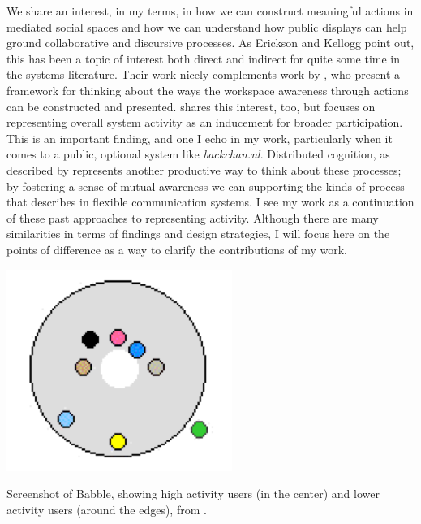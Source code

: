 \documentclass{tufte-handout}
\begin{document}
We share an interest, in my terms, in how we can construct meaningful actions in mediated social spaces and how we can understand how public displays can help ground collaborative and discursive processes. As Erickson and Kellogg point out, this has been a topic of interest both direct and indirect for quite some time in the systems literature. Their work nicely complements work by \citet{Gutwin:2002tf}, who present a framework for thinking about the ways the workspace awareness through actions can be constructed and presented.  \citet{Ackerman:1995tj} shares this interest, too, but focuses on representing overall system activity as an inducement for broader participation. This is an important finding, and one I echo in my work, particularly when it comes to a public, optional system like \emph{backchan.nl}. Distributed cognition, as described by \citet{Hollan:2000ud} represents another productive way to think about these processes; by fostering a sense of mutual awareness we can supporting the kinds of process that \citet{Hutchins:1995ud} describes in flexible communication systems. I see my work as a continuation of these past approaches to representing activity. Although there are many similarities in terms of findings and design strategies, I will focus here on the points of difference as a way to clarify the contributions of my work.

\begin{marginfigure}
	\includegraphics{figures/babble.png}
	\caption{Screenshot of Babble, showing high activity users (in the center) and lower activity users (around the edges), from \citep{Erickson:2003td}.}
	\label{fig:proxy-babble}
\end{marginfigure}
\end{document}
